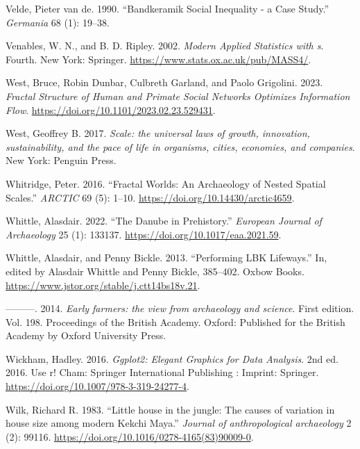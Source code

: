 \documentclass[
  12pt,
  a4paper, twoside]{book}
\newlength{\cslhangindent}
\newlength{\cslentryspacingunit} %
\newenvironment{CSLReferences}[2] %
 {%
  \setlength{\parindent}{0pt}
  \ifodd #1
  \let\oldpar\par
  \def\par{\hangindent=\cslhangindent\oldpar}
  \fi
  \setlength{\parskip}{#2\cslentryspacingunit}
 }%
 {}
\begin{document}
\begin{CSLReferences}{1}{0}
\leavevmode{}%
Velde, Pieter van de. 1990. {``Bandkeramik Social Inequality - a Case Study.''} \emph{Germania} 68 (1): 19--38.

\leavevmode{}%
Venables, W. N., and B. D. Ripley. 2002. \emph{Modern Applied Statistics with s}. Fourth. New York: Springer. \url{https://www.stats.ox.ac.uk/pub/MASS4/}.

\leavevmode{}%
West, Bruce, Robin Dunbar, Culbreth Garland, and Paolo Grigolini. 2023. \emph{Fractal Structure of Human and Primate Social Networks Optimizes Information Flow}. \url{https://doi.org/10.1101/2023.02.23.529431}.

\leavevmode{}%
West, Geoffrey B. 2017. \emph{Scale: the universal laws of growth, innovation, sustainability, and the pace of life in organisms, cities, economies, and companies}. New York: Penguin Press.

\leavevmode{}%
Whitridge, Peter. 2016. {``Fractal Worlds: An Archaeology of Nested Spatial Scales.''} \emph{ARCTIC} 69 (5): 1--10. \url{https://doi.org/10.14430/arctic4659}.

\leavevmode{}%
Whittle, Alasdair. 2022. {``The Danube in Prehistory.''} \emph{European Journal of Archaeology} 25 (1): 133137. \url{https://doi.org/10.1017/eaa.2021.59}.

\leavevmode{}%
Whittle, Alasdair, and Penny Bickle. 2013. {``Performing LBK Lifeways.''} In, edited by Alasdair Whittle and Penny Bickle, 385--402. Oxbow Books. \url{https://www.jstor.org/stable/j.ctt14bs18v.21}.

\leavevmode{}%
---------. 2014. \emph{Early farmers: the view from archaeology and science}. First edition. Vol. 198. Proceedings of the British Academy. Oxford: Published for the British Academy by Oxford University Press.

\leavevmode{}%
Wickham, Hadley. 2016. \emph{Ggplot2: Elegant Graphics for Data Analysis}. 2nd ed. 2016. Use r! Cham: Springer International Publishing : Imprint: Springer. \url{https://doi.org/10.1007/978-3-319-24277-4}.

\leavevmode{}%
Wilk, Richard R. 1983. {``Little house in the jungle: The causes of variation in house size among modern Kekchi Maya.''} \emph{Journal of anthropological archaeology} 2 (2): 99116. \url{https://doi.org/10.1016/0278-4165(83)90009-0}.


\end{CSLReferences}
\end{document}
